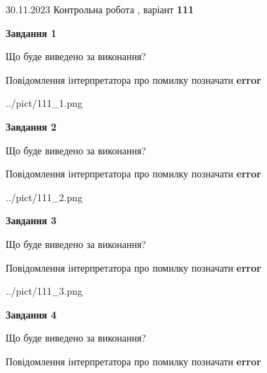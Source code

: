 \documentclass[12pt, ukrainian]{article}
\begin{document}
{{30.11.2023 Контрольна робота , варіант  \No \textbf { 111 }\par}}
{




{\begin {center}\textbf{Завдання 1}\end {center}}\par
Що буде виведено за виконання? \par
Повідомлення інтерпретатора про помилку позначати \textbf{error}

\begin{center}
	{../pict/111_1.png}
\end{center}
\newpage

{\begin {center}\textbf{Завдання 2}\end {center}}\par
Що буде виведено за виконання? \par
Повідомлення інтерпретатора про помилку позначати \textbf{error}

\begin{center}
	{../pict/111_2.png}
\end{center}
\newpage

{\begin {center}\textbf{Завдання 3}\end {center}}\par
Що буде виведено за виконання? \par
Повідомлення інтерпретатора про помилку позначати \textbf{error}

\begin{center}
	{../pict/111_3.png}
\end{center}
\newpage

{\begin {center}\textbf{Завдання 4}\end {center}}\par
Що буде виведено за виконання? \par
Повідомлення інтерпретатора про помилку позначати \textbf{error}

}
\end{document}
